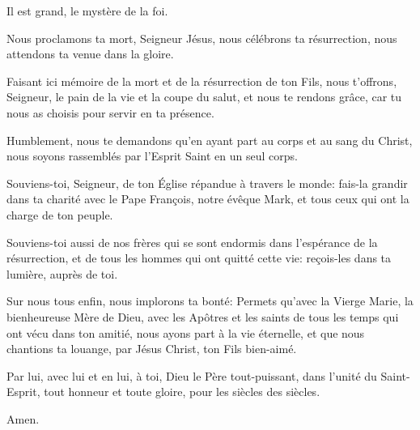 \pr Il est grand, le mystère de la foi.

\be Nous proclamons ta mort, Seigneur Jésus, nous célébrons ta résurrection, nous attendons ta venue dans la gloire.

\newpage\pr Faisant ici mémoire de la mort et de la résurrection de ton Fils, nous t'offrons, Seigneur, le pain de la vie et la coupe du salut, et nous te rendons grâce, car tu nous as choisis pour servir en ta présence.

\pr Humblement, nous te demandons qu'en ayant part au corps et au sang du Christ, nous soyons rassemblés par l'Esprit Saint en un seul corps.

\pr Souviens-toi, Seigneur, de ton Église répandue à travers le monde: fais-la grandir dans ta charité avec le Pape François, notre évêque Mark, et tous ceux qui ont la charge de ton peuple.

\pr Souviens-toi aussi de nos frères qui se sont endormis dans l'espérance de la résurrection, et de tous les hommes qui ont quitté cette vie: reçois-les dans ta lumière, auprès de toi.

\pr Sur nous tous enfin, nous implorons ta bonté: Permets qu’avec la Vierge Marie, la bienheureuse Mère de Dieu, avec les Apôtres et les saints de tous les temps qui ont vécu dans ton amitié, nous ayons part à la vie éternelle, et que nous chantions ta louange, par Jésus Christ, ton Fils bien-aimé.

\pr Par lui, avec lui et en lui, à toi, Dieu le Père tout-puissant, dans l'unité du Saint-Esprit, tout honneur et toute gloire, pour les siècles des siècles.

\be Amen.